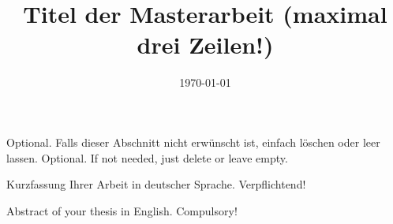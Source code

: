 \documentclass[
  type=MA, %
  lang=german, %
  study=Bau, %
  uni=LFUI, %
  expose=false, %
  explanation=true, %
  specialization=BBP, %
]{ftwthesis}
\title{Titel der Masterarbeit (maximal drei Zeilen!)}
\date{\today}
\begin{document}
\frontmatter

\begin{Acknowledgment}
  {Optional. Falls dieser Abschnitt nicht erwünscht ist, einfach löschen oder
  leer lassen.}
  {Optional. If not needed, just delete or leave empty.}
\end{Acknowledgment}

\begin{Kurzfassung}
  Kurzfassung Ihrer Arbeit in deutscher Sprache. Verpflichtend!
\end{Kurzfassung}

\begin{Abstract}
  Abstract of your thesis in English. Compulsory!
\end{Abstract}

\tableofcontents*\cleardoublepage

\listoffigures\cleardoublepage

\listoftables\cleardoublepage


\mainmatter

\FTWBlindDocument

\backmatter


\end{document}
